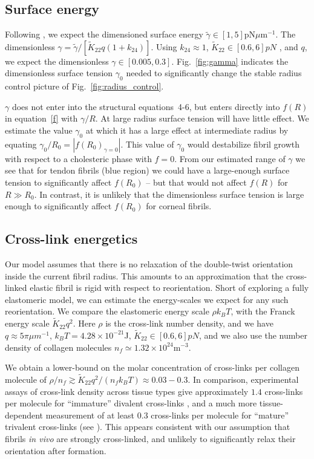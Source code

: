 \documentclass[twoside,twocolumn,9pt]{article}
\begin{document}
\subsection{Surface energy}
Following \citet{Jawerth:2018}, we expect the dimensioned surface energy $\tilde{\gamma}\in [1,5]$pN$\mu$m$^{-1}$. The dimensionless $\gamma = \tilde{\gamma}/\left[\tilde{K}_{22} q (1+k_{24})\right]$. Using $k_{24} \approx 1$, $\tilde{K}_{22} \in [0.6,6]pN$ \cite{Cameron:2018}, and $q$, we expect the dimensionless $\gamma\in [0.005,0.3]$.  Fig.~\ref{fig:gamma} indicates the dimensionless surface tension $\gamma_0$ needed to significantly change the stable radius control picture of Fig.~\ref{fig:radius_control}. 

$\gamma$ does not enter into the structural equations~4-6, but enters directly into $f(R)$ in equation~\ref{f} with $\gamma/R$. At large radius surface tension will have little effect. We estimate the value $\gamma_0$ at which it has a large effect at intermediate radius by equating $\gamma_0/R_0 = |f(R_0)_{\gamma=0}|$. This value of $\gamma_0$ would destabilize fibril growth with respect to a cholesteric phase with $f=0$. From our estimated range of $\gamma$ we see that for tendon fibrils (blue region) we could have a large-enough surface tension to significantly affect $f(R_0)$ -- but that would not affect $f(R)$ for $R \gg R_0$. In contrast, it is unlikely that the dimensionless surface tension is large enough to significantly affect $f(R_0)$ for corneal fibrils.

\subsection{Cross-link energetics}
Our model assumes that there is no relaxation of the double-twist orientation inside the current fibril radius. This amounts to an approximation that the cross-linked elastic fibril is rigid with respect to reorientation. Short of exploring a fully elastomeric model, we can estimate the energy-scales we expect for any such reorientation.  We compare the elastomeric energy scale $\rho k_B T$,\cite{Warner:1996} with the Franck energy scale $\tilde{K}_{22} q^2$. Here $\rho$ is the cross-link number density, and we have $q \approx 5 \pi \mu m^{-1}$, $k_B T=4.28 \times 10^{-21}$J, $\tilde{K}_{22} \in [0.6,6]pN$,\cite{Cameron:2018} and we also use the number density of collagen molecules
$n_f \simeq 1.32\times 10^{24}$m$^{-3}$.

We obtain a lower-bound on the molar concentration of cross-links per collagen molecule of $\rho/n_f \gtrsim \tilde{K}_{22} q^2/\left( n_f k_B T \right) \approx 0.03 - 0.3$. In comparison, experimental assays of cross-link density across tissue types give approximately $1.4$ cross-links per molecule for ``immature'' divalent cross-links \cite{Saito:1997}, and a much more tissue-dependent measurement of at least $0.3$ cross-links per molecule for ``mature'' trivalent cross-links (see \cite{Depalle:2015}). This appears consistent with our assumption that fibrils \emph{in vivo} are strongly cross-linked, and unlikely to significantly relax their orientation after formation.
\end{document}
